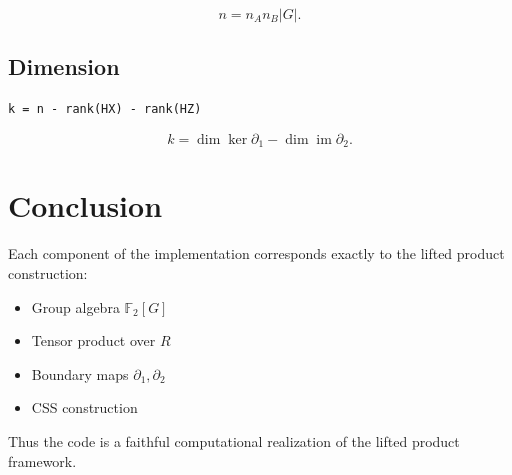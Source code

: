 \documentclass[11pt]{article}
\begin{document}
\begin{equation}
n = n_A n_B |G|.
\end{equation}

\subsection{Dimension}

\begin{verbatim}
k = n - rank(HX) - rank(HZ)
\end{verbatim}

\begin{equation}
k = \dim \ker \partial_1 - \dim \operatorname{im} \partial_2.
\end{equation}

\section{Conclusion}

Each component of the implementation corresponds exactly to the lifted product construction:
\begin{itemize}
\item Group algebra $\mathbb{F}_2[G]$
\item Tensor product over $R$
\item Boundary maps $\partial_1, \partial_2$
\item CSS construction
\end{itemize}

Thus the code is a faithful computational realization of the lifted product framework.
\end{document}
